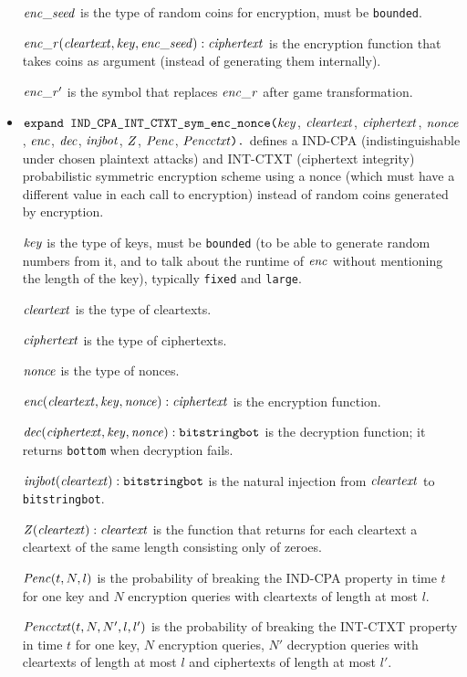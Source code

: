 \documentclass{article}
\begin{document}
\begin{itemize}
  $\mathit{enc\_seed}$ is the type of random coins for encryption, must be \texttt{bounded}.

  $\mathit{enc\_r}(\mathit{cleartext}, \mathit{key}, \mathit{enc\_seed}): \mathit{ciphertext}$ is the encryption function that takes coins as argument (instead of generating them internally).

  $\mathit{enc\_r}'$ is the symbol that replaces $\mathit{enc\_r}$ after game transformation.

\item $\texttt{expand IND\_CPA\_INT\_CTXT\_sym\_enc\_nonce(}\mathit{key}$,
  $\mathit{cleartext}$, $\mathit{ciphertext}$, $\mathit{nonce}$, $\mathit{enc}$,
  $\mathit{dec}$, $\mathit{injbot}$, $\mathit{Z}$, $\mathit{Penc}$, $\mathit{Pencctxt}\texttt{).}$ defines a
  IND-CPA (indistinguishable under chosen plaintext attacks) and INT-CTXT (ciphertext integrity)
  probabilistic symmetric encryption scheme using a nonce 
   (which must have a different value in each call to encryption)
   instead of random coins generated by encryption.

   $\mathit{key}$ is the type of keys, must be \texttt{bounded} (to be able to generate random numbers from it, and to talk about the runtime of $\mathit{enc}$ without mentioning the length of the key), typically \texttt{fixed} and \texttt{large}.

   $\mathit{cleartext}$ is the type of cleartexts.

   $\mathit{ciphertext}$ is the type of ciphertexts.

   $\mathit{nonce}$ is the type of nonces.

   $\mathit{enc}(\mathit{cleartext}, \mathit{key}, \mathit{nonce}): \mathit{ciphertext}$ is the encryption function.

   $\mathit{dec}(\mathit{ciphertext}, \mathit{key}, \mathit{nonce}): \texttt{bitstringbot}$ is the
  decryption function; it returns \texttt{bottom} when decryption
  fails.

   $\mathit{injbot}(\mathit{cleartext}): \texttt{bitstringbot}$ is the natural
  injection from $\mathit{cleartext}$ to \texttt{bitstringbot}.

   $\mathit{Z}(\mathit{cleartext}): \mathit{cleartext}$ is the function that
  returns for each cleartext a cleartext of the same length consisting
  only of zeroes.

  $\mathit{Penc}(t, N, l)$ is the probability of breaking the IND-CPA
  property in time $t$ for one key and $N$ encryption queries with
  cleartexts of length at most $l$.

  $\mathit{Pencctxt}(t, N, N', l, l')$ is the probability of breaking the
  INT-CTXT property in time $t$ for one key, $N$ encryption queries,
  $N'$ decryption queries with cleartexts of length at most $l$ and
  ciphertexts of length at most $l'$.


\end{itemize}
\end{document}
